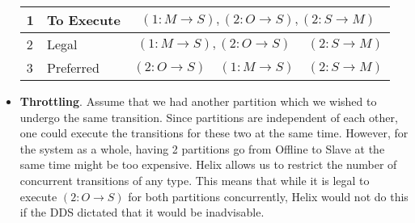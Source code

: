 \documentclass[12pt]{article}
\begin{document}
\begin{itemize}
\begin{table}[h]
\centering
\begin{tabular}{|l|l||l|l|l|} \hline \hline
1 & To Execute & \multicolumn{3}{|c|}{\((1: M \rightarrow S), 
(2: O \rightarrow S), (2: S \rightarrow M)\)} \\ \hline 
2 & Legal & \multicolumn{2}{|c|}{\((1: M \rightarrow S), (2: O \rightarrow S)\)} & \((2: S \rightarrow M)\) \\ \hline
3 & Preferred & \((2: O \rightarrow S)\) & \((1: M \rightarrow S)\) & \((2: S \rightarrow M)\) \\ \hline
\hline
\end{tabular}
\label{state_transitions}
\end{table}
\item {\bf Throttling}. Assume that we had another partition which we wished to undergo
the same transition. Since partitions are independent of each other, one
could execute the transitions for these two at the same time. However,
for the system as a whole, having 2 partitions go from Offline to Slave
at the same time might be too expensive. Helix allows us to restrict the
number of concurrent transitions of any type. This means that while it
is legal to execute \((2: O \rightarrow S)\) for both partitions
concurrently, Helix would not do this if the DDS dictated that it would
be inadvisable.

\end{itemize}
\end{document}
